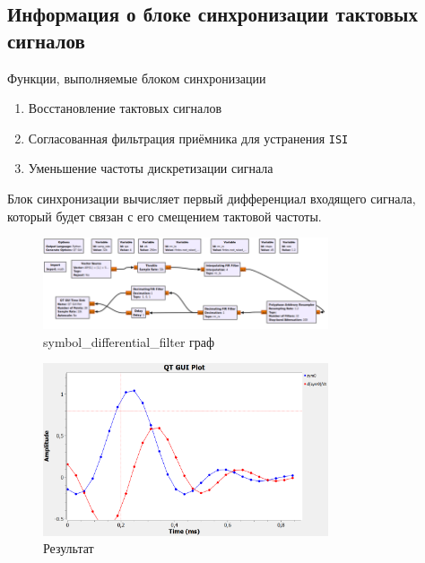 \documentclass[a4paper,12pt]{article}
\begin{document}
	
	\subsection{Информация о блоке синхронизации тактовых сигналов}
	
	Функции, выполняемые блоком синхронизации
	
	\begin{enumerate}
		
		\item
		
		Восстановление тактовых сигналов
		
		\item
		
		Согласованная фильтрация приёмника для устранения \texttt{ISI}
		
		\item
		
		Уменьшение частоты дискретизации сигнала
		 
		
	\end{enumerate}
	
	Блок синхронизации вычисляет первый дифференциал входящего сигнала, который будет связан с его смещением тактовой частоты. 
	
	\begin{figure}[H]
		\centering
		\includegraphics[width=0.75\textwidth]{3_5.png}
		\caption{symbol\_differential\_filter граф}
		\label{fig:3.5}
	\end{figure}
	
	\begin{figure}[H]
		\centering
		\includegraphics[width=0.75\textwidth]{3_6.png}
		\caption{Результат}
		\label{fig:3.6}
	\end{figure}
	
\end{document}
